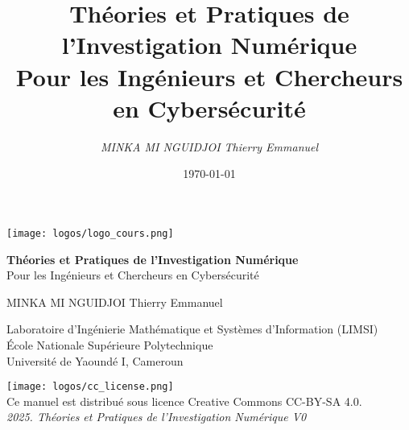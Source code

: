 \documentclass[11pt,a4paper,oneside]{book}
\title{Théories et Pratiques de l'Investigation Numérique\\\large{Pour les Ingénieurs et Chercheurs en Cybersécurité}}
\author{\textit{MINKA MI NGUIDJOI Thierry Emmanuel}\\\small\textipa{Mal\textepsilon tY\textopeno n}}
\date{\today}
\begin{document}
    \begin{titlepage}
        \centering
        \vspace*{1cm}
        
        \texttt{[image: logos/logo\_cours.png]}\\
        \vspace{1cm}
        
        {\Huge \textbf{Théories et Pratiques de l'Investigation Numérique}}\\
        \vspace{0.5cm}
        {\Large Pour les Ingénieurs et Chercheurs en Cybersécurité}\\
        \vspace{6cm}
        
        {\large MINKA MI NGUIDJOI Thierry Emmanuel}\\
        \vspace{1cm}
        
        
        {\large Laboratoire d'Ingénierie Mathématique et Systèmes d'Information (LIMSI)}\\
        \vspace{0.2cm}
        {\large École Nationale Supérieure Polytechnique}\\
        \vspace{0.2cm}
        {\large Université de Yaoundé I, Cameroun}\\
        \vspace{2.5cm}
        
        
        \texttt{[image: logos/cc\_license.png]}\\
        {\small Ce manuel est distribué sous licence Creative Commons CC-BY-SA 4.0.}\\
        {\small\hfill\textit{ 2025. Théories et Pratiques de l'Investigation Numérique V0}}
    \end{titlepage}
\end{document}
